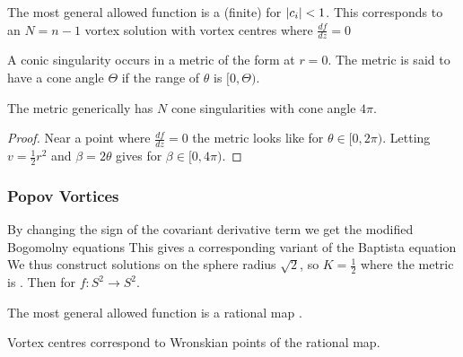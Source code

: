 \documentclass{article}
\begin{document}
\begin{prop}
The most general allowed function is a (finite) 
for $\left\lvert c_i \right\rvert<1$. This corresponds to an $N=n-1$ vortex solution with vortex centres where $\frac{df}{dz}=0$
\end{prop}

\begin{definition}
A conic singularity occurs in a metric of the form 
at $r=0$. The metric is said to have a cone angle $\Theta$ if the range of $\theta$ is $[0,\Theta)$. 
\end{definition}

\begin{prop}
The metric 
generically has $N$ cone singularities with cone angle $4\pi$. 
\end{prop}
\begin{proof}
Near a point where $\frac{df}{dz} = 0$ the metric looks like 
for $\theta \in [0,2\pi)$. Letting $v = \frac{1}{2}r^2$ and $\beta = 2\theta$ gives 
for $\beta\in[0,4\pi)$. 
\end{proof}

\subsubsection{Popov Vortices}
By changing the sign of the covariant derivative term we get the modified Bogomolny equations 
This gives a corresponding variant of the Baptista equation 
We thus construct solutions on the sphere radius $\sqrt{2}$, so $K = \frac{1}{2}$ where the metric is 
. Then 
for $f : S^2 \to S^2$. 

\begin{prop}
The most general allowed function is a rational map .
\end{prop}

\begin{prop}
Vortex centres correspond to Wronskian points of the rational map.
\end{prop}
\end{document}

